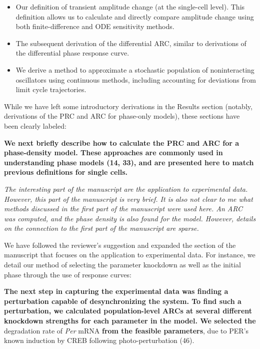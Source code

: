 \documentclass[11pt, letterpaper]{article}
\newenvironment{reviewer}{\itshape\color{gray}}{}
\newenvironment{manuscript}[1]{\begin{center}\begin{tcolorbox}[colback=green!5!white,colframe=green!75!black,width=0.8\textwidth,title={#1},breakable,fonttitle=\bfseries]}{\end{tcolorbox}\end{center}}
\begin{document}
\begin{itemize}
  \item Our definition of transient amplitude change (at the single-cell level). This definition allows us to calculate and directly compare amplitude change using both finite-difference and ODE sensitivity methods.
  \item The subsequent derivation of the differential ARC, similar to derivations of the differential phase response curve.
  \item We derive a method to approximate a stochastic population of noninteracting oscillators using continuous methods, including accounting for deviations from limit cycle trajectories.
\end{itemize}

While we have left some introductory derivations in the Results section (notably, derivations of the PRC and ARC for phase-only models), these sections have been clearly labeled:

\begin{manuscript}{Page 11}
\bfseries
We next briefly describe how to calculate the PRC and ARC for a phase-density model.
These approaches are commonly used in understanding phase models (14, 33), and are presented here to match previous definitions for single cells.
\end{manuscript}


\begin{reviewer}
The interesting part of the manuscript are the application to experimental data.
However, this part of the manuscript is very brief.
It is also not clear to me what methods discussed in the first part of the manuscript were used here.
An ARC was computed, and the phase density is also found for the model.
However, details on the connection to the first part of the manuscript are sparse.
\end{reviewer}

We have followed the reviewer's suggestion and expanded the section of the manuscript that focuses on the application to experimental data.
For instance, we detail our method of selecting the parameter knockdown as well as the initial phase through the use of response curves:

\begin{manuscript}{Page 16}
{\bfseries
The next step in capturing the experimental data was finding a perturbation capable of desynchronizing the system.
To find such a perturbation, we calculated population-level ARCs at several different knockdown strengths for each parameter in the model.
We selected the} degradation rate of {\itshape Per} mRNA {\bfseries from the feasible parameters}, due to PER's known induction by CREB following photo-perturbation (46).
\end{manuscript}
\end{document}
